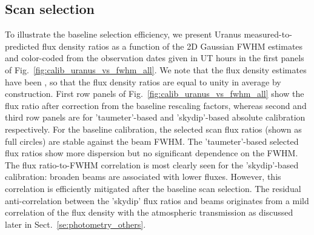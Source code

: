 
 
\subsection{Scan selection}
\label{se:baseline_calibration_scans}

To illustrate the baseline selection efficiency, we present Uranus
measured-to-predicted flux density ratios as a function of the 2D
Gaussian FWHM estimates and color-coded from the observation dates
given in UT hours in the first panels of
Fig.~\ref{fig:calib_uranus_vs_fwhm_all}.
We note that the flux density estimates have been
, so that the flux density ratios are equal to unity
in average by construction. First row panels of
Fig.~\ref{fig:calib_uranus_vs_fwhm_all} show the flux ratio after
correction from the baseline rescaling factors, whereas second and
third row panels are for 'taumeter'-based and 'skydip'-based absolute
calibration respectively. For the baseline calibration, the selected
scan flux ratios (shown as full circles) are stable against the beam
FWHM. The 'taumeter'-based selected flux ratios show more dispersion
but no significant dependence on the FWHM. The flux ratio-to-FWHM
correlation is most clearly seen for the 'skydip'-based calibration:
broaden beams are associated with lower fluxes. However, this
correlation is efficiently mitigated after the baseline scan
selection. The residual anti-correlation between
the 'skydip' flux ratios and beams originates from a mild
correlation of the flux density with the atmospheric transmission as
discussed later in Sect.~\ref{se:photometry_others}. 

